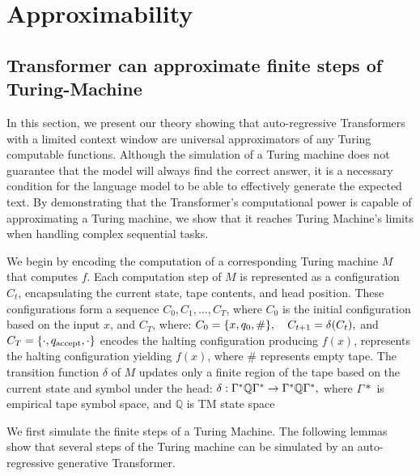 \section{Approximability}\label{section4}
\subsection{Transformer can approximate finite steps of Turing-Machine}\label{section:approximation}

In this section, we present our theory showing that auto-regressive Transformers with a limited context window are universal approximators of any Turing computable functions. Although the simulation of a Turing machine does not guarantee that the model %
will always find the correct answer, it is a necessary condition for the language model to be able to effectively generate the expected text. %
By demonstrating that the Transformer's computational power is capable of approximating a Turing machine, we show that it reaches Turing Machine's limits %
when handling complex sequential tasks.

We begin by encoding the computation of a corresponding Turing machine \( M \) that computes \( f \). Each computation step of \( M \) is represented as a configuration \( C_t \), encapsulating the current state, tape contents, and head position. These configurations form a sequence \( C_0, C_1, \dots, C_T \), where \( C_0 \) is the initial configuration based on the input \( x \), and \( C_T \), where: \( C_0 = {\color{black}\{x,q_0,\#\}}, \quad C_{t+1} = \delta(C_t), \) and  \(C_T = {\color{black}\{\cdot,q_{\text{accept}},\cdot\} }\) encodes the halting configuration producing \( f(x) \),  represents the halting configuration yielding \( f(x) \), {\color{black} where \(\#\) represents empty tape}.
The transition function \( \delta \) of \( M \) updates only a finite region of the tape based on the current state and symbol under the head:
  \(
  \delta: \Gamma^* {\color{black}\mathbb{Q}} \Gamma^* \rightarrow \Gamma^* {\color{black}\mathbb{Q}} \Gamma^*,
  \) {\color{black} where \(\Gamma*\) is empirical tape symbol space, and \(\mathbb{Q}\) is TM state space}


We first simulate the finite steps of a Turing Machine. The following lemmas show that several steps of the Turing machine can be simulated by an auto-regressive generative Transformer.

